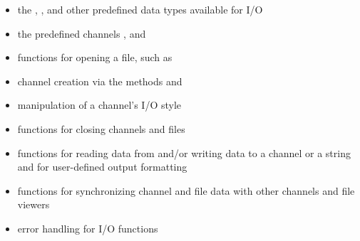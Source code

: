 \begin{itemize}

\item the , , and other predefined data types
      available for I/O

\item the predefined channels ,  and 

\item functions for opening a file, such as 


\item channel creation via the methods  and 

\item manipulation of a channel's I/O style


\item functions for closing channels and files


\item functions for reading data from and/or writing data to a channel
      or a string and for user-defined output formatting


\item functions for synchronizing channel and file data
      with other channels and file viewers


\item error handling for I/O functions

\end{itemize}


